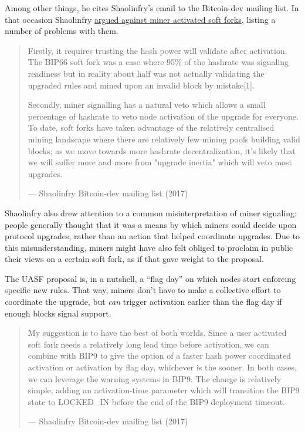 Among other things, he cites Shaolinfry's email to the Bitcoin-dev
mailing list. In that occasion Shaolinfry
\href{https://lists.linuxfoundation.org/pipermail/bitcoin-dev/2017-February/013643.html}{argued
against miner activated soft forks}, listing a number of problems with
them.

\begin{quote}
Firstly, it requires trusting the hash power will validate after
activation. The BIP66 soft fork was a case where 95\% of the hashrate
was signaling readiness but in reality about half was not actually
validating the upgraded rules and mined upon an invalid block by
mistake{[}1{]}.

Secondly, miner signalling has a natural veto which allows a small
percentage of hashrate to veto node activation of the upgrade for
everyone. To date, soft forks have taken advantage of the relatively
centralised mining landscape where there are relatively few mining pools
building valid blocks; as we move towards more hashrate
decentralization, it's likely that we will suffer more and more from
"upgrade inertia" which will veto most upgrades.

---  Shaolinfry Bitcoin-dev mailing list (2017)
\end{quote}

Shaolinfry also drew attention to a common misinterpretation of miner
signaling: people generally thought that it was a means by which miners
could decide upon protocol upgrades, rather than an action that helped
coordinate upgrades. Due to this misunderstanding, miners might have
also felt obliged to proclaim in public their views on a certain soft
fork, as if that gave weight to the proposal.

The UASF proposal is, in a nutshell, a ``flag day'' on which nodes start
enforcing specific new rules. That way, miners don't have to make a
collective effort to coordinate the upgrade, but \emph{can} trigger
activation earlier than the flag day if enough blocks signal support.

\begin{quote}
My suggestion is to have the best of both worlds. Since a user activated
soft fork needs a relatively long lead time before activation, we can
combine with BIP9 to give the option of a faster hash power coordinated
activation or activation by flag day, whichever is the sooner. In both
cases, we can leverage the warning systems in BIP9. The change is
relatively simple, adding an activation-time parameter which will
transition the BIP9 state to LOCKED\_IN before the end of the BIP9
deployment timeout.

---  Shaolinfry Bitcoin-dev mailing list (2017)
\end{quote}

